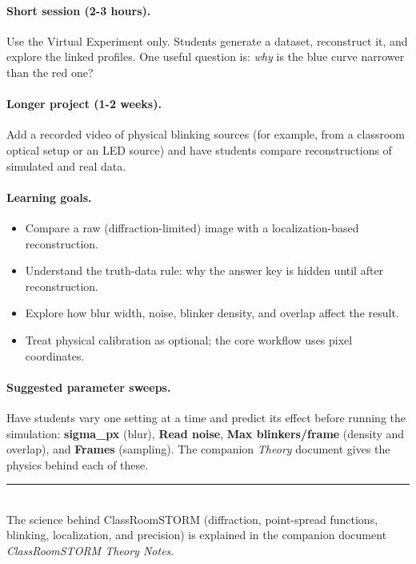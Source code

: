 \documentclass[11pt,a4paper]{article}
\newcommand{\ui}[1]{\textbf{#1}}
\newcommand{\app}{ClassRoomSTORM}
\begin{document}
\paragraph{Short session (2-3 hours).} Use the Virtual Experiment only.
Students generate a dataset, reconstruct it, and explore the linked profiles. One useful question is: \emph{why} is the blue curve narrower than the red one?

\paragraph{Longer project (1-2 weeks).} Add a recorded video of physical blinking sources (for example, from a classroom optical setup or an LED source) and have
students compare reconstructions of simulated and real data.

\paragraph{Learning goals.}
\begin{itemize}
  \item Compare a raw (diffraction-limited) image with a localization-based
        reconstruction.
  \item Understand the truth-data rule: why the answer key is hidden until after
        reconstruction.
  \item Explore how blur width, noise, blinker density, and overlap affect the
        result.
  \item Treat physical calibration as optional; the core workflow uses pixel coordinates.
\end{itemize}

\paragraph{Suggested parameter sweeps.} Have students vary one setting at a time
and predict its effect before running the simulation: \ui{sigma\_px} (blur), \ui{Read noise},
\ui{Max blinkers/frame} (density and overlap), and \ui{Frames} (sampling). The
companion \emph{Theory} document gives the physics behind each of these.

\vfill
\noindent\rule{\linewidth}{0.4pt}\\[2pt]
{\footnotesize The science behind \app{} (diffraction, point-spread functions, blinking, localization, and precision) is explained in the
companion document \emph{\app{} Theory Notes}.}
\end{document}
